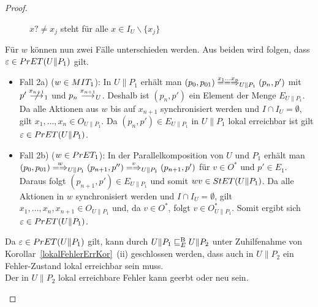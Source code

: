 \begin{proof}
\begin{itemize}
\begin{figure} [h!tbp]
\begin{center}
        \caption{$x?\neq x_j$ steht für alle $x\in I_U\backslash\{x_j\}$}
      \label{UohneE}
      \end{center}
      \end{figure}
      Für $w$ können nun zwei Fälle unterschieden werden. Aus beiden wird
      folgen, dass $\varepsilon\in PrET(U\|P_1)$ gilt.
      \begin{itemize}
        \item Fall 2a) ($w\in MIT _1$): In $U\|P_1$ erhält man $(p_0,p_{01})
          \lweakmay[x_1\dots x_n]_{U\|P_1} (p_n,p')$ mit $p'\nmust[x_{n+1}]_1$
          und $p_n\must[x_{n+1}]_U$. Deshalb ist $(p_n,p')$ ein Element der
          Menge $E_{U\|P_1}$. Da alle Aktionen aus $w$ bis auf $x_{n+1}$
          synchronisiert werden und $I\cap I_U=\emptyset$, gilt $x_1,\dots ,
          x_n\in O_{U\|P_1}$. Da $(p_n,p')\in E_{U\|P_1}$ in $U\|P_1$ lokal
          erreichbar ist gilt $\varepsilon\in PrET (U\|P_1)$.
        \item Fall 2b) ($w\in PrET _1$): In der Parallelkomposition von $U$ und
          $P_1$ erhält man $(p_0,p_{01}) \weakmay[w]_{U\|P_1} (p_{n+1},p'')
          \weakmay[v]_{U\|P_1} (p_{n+1},p')$ für $v\in O^*$ und $p'\in E_1$.
          Daraus folgt $(p_{n+1},p')\in E_{U\|P_1}$ und somit $wv\in StET
          (U\|P_1)$. Da alle Aktionen in $w$ synchronisiert werden und $I\cap
          I_U=\emptyset$, gilt $x_1,\dots ,x_n,x_{n+1}\in O_{U\|P_1}$ und, da
          $v\in O^*$, folgt $v\in O_{U\|P_1}^*$. Somit ergibt sich
          $\varepsilon\in PrET (U\|P_1)$.
      \end{itemize}
      Da $\varepsilon\in PrET (U\|P_1)$ gilt, kann durch $U\|P_1 \sqsubseteq  _E^\mathrm{B} U\|P_2$
      unter Zuhilfenahme von Korollar~\ref{lokalFehlerErrKor}~(ii) geschlossen
      werden, dass auch in $U\|P_2$ ein Fehler-Zustand lokal erreichbar sein
      muss.\\
      Der in $U\|P_2$ lokal erreichbare Fehler kann geerbt oder neu sein.
      \begin{itemize}

\end{itemize}
\end{itemize}
\end{proof}
